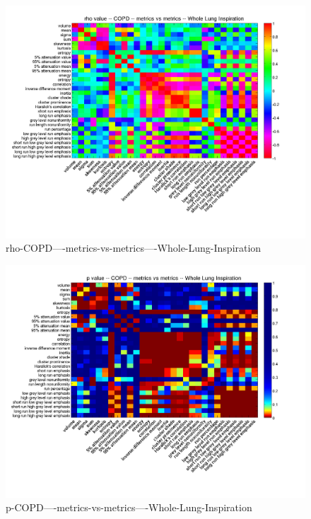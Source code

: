 \documentclass[12pt]{article}
\begin{document}
\begin{figure}
        \includegraphics[width=0.84\linewidth,viewport=100 60 620 550]{corr/rho-COPD----metrics-vs-metrics----Whole-Lung-Inspiration.png}
    \caption{rho-COPD----metrics-vs-metrics----Whole-Lung-Inspiration}
    \label{fig:rho-COPD----metrics-vs-metrics----Whole-Lung-Inspiration}
\end{figure}
\begin{figure}
    \includegraphics[width=0.84\linewidth,viewport=100 60 620 550]{corr/p-COPD----metrics-vs-metrics----Whole-Lung-Inspiration.png}
    \caption{p-COPD----metrics-vs-metrics----Whole-Lung-Inspiration}
    \label{fig:p-COPD----metrics-vs-metrics----Whole-Lung-Inspiration}
\end{figure}
\end{document}
